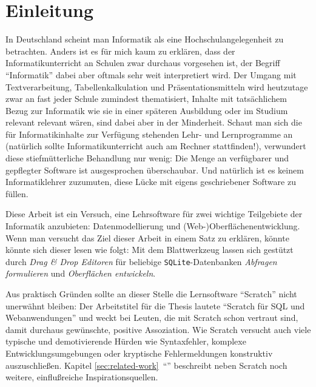 \section{Einleitung}
\label{sec:introduction}

In Deutschland scheint man Informatik als eine Hochschulangelegenheit zu betrachten. Anders ist es für mich kaum zu erklären, dass der Informatikunterricht an Schulen zwar durchaus vorgesehen ist, der Begriff ``Informatik'' dabei aber oftmals sehr weit interpretiert wird. Der Umgang mit Textverarbeitung, Tabellenkalkulation und Präsentationsmitteln wird heutzutage zwar an fast jeder Schule zumindest thematisiert, Inhalte mit tatsächlichem Bezug zur Informatik wie sie in einer späteren Ausbildung oder im Studium relevant relevant wären, sind dabei aber in der Minderheit. Schaut man sich die für Informatikinhalte zur Verfügung stehenden Lehr- und Lernprogramme an (natürlich sollte Informatikunterricht auch am Rechner stattfinden!), verwundert diese stiefmütterliche Behandlung nur wenig: Die Menge an verfügbarer und gepflegter Software ist ausgesprochen überschaubar. Und natürlich ist es keinem Informatiklehrer zuzumuten, diese Lücke mit eigens geschriebener Software zu füllen.

Diese Arbeit ist ein Versuch, eine Lehrsoftware für zwei wichtige Teilgebiete der Informatik anzubieten: Datenmodellierung und (Web-)Oberflächenentwicklung. Wenn man versucht das Ziel dieser Arbeit in einem Satz zu erklären, könnte könnte sich dieser lesen wie folgt: Mit dem Blattwerkzeug lassen sich gestützt durch \textit{Drag \& Drop Editoren} für beliebige \texttt{SQLite}-Datenbanken \textit{Abfragen formulieren} und \textit{Oberflächen entwickeln}.

Aus praktisch Gründen sollte an dieser Stelle die Lernsoftware "`Scratch"' nicht unerwähnt bleiben: Der Arbeitstitel für die Thesis lautete "`Scratch für SQL und Webanwendungen"' und weckt bei Leuten, die mit Scratch schon vertraut sind, damit durchaus gewünschte, positive Assoziation. Wie Scratch versucht auch \idename{} viele typische und demotivierende Hürden wie Syntaxfehler, komplexe Entwicklungsumgebungen oder kryptische Fehlermeldungen konstruktiv auszuschließen. Kapitel \ref{sec:related-work}~"`"' beschreibt neben Scratch noch weitere, einflußreiche Inspirationsquellen.

